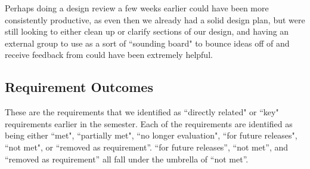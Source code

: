 \medskip

Perhaps doing a design review a few weeks earlier could have been more consistently productive, as even then we already had a solid design plan, but were still looking to either clean up or clarify sections of our design, and having an external group to use as a sort of ``sounding board" to bounce ideas off of and receive feedback from could have been extremely helpful. 

\subsection*{Requirement Outcomes}
These are the requirements that we identified as ``directly related" or ``key" requirements earlier in the semester. Each of the requirements are identified as being either ``met", ``partially met", ``no longer evaluation", ``for future releases", ``not met", or ``removed as requirement''. 
\smallbreak
``for future releases'', ``not met'', and ``removed as requirement'' all fall under the umbrella of ``not met''. 
